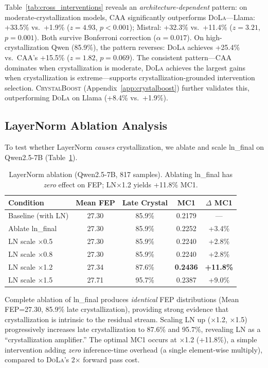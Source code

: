 \documentclass{article}
\newcommand{\dola}{\textsc{DoLa}}
\newcommand{\crystalboost}{\textsc{CrystalBoost}}
\newcommand{\caa}{\textsc{CAA}}
\begin{document}
Table~\ref{tab:cross_interventions} reveals an \emph{architecture-dependent} pattern: on moderate-crystallization models, \caa{} significantly outperforms \dola{}---Llama: +33.5\% vs.\ +1.9\% ($z{=}4.93$, $p{<}0.001$); Mistral: +32.3\% vs.\ +11.4\% ($z{=}3.21$, $p{=}0.001$). Both survive Bonferroni correction ($\alpha{=}0.017$). On high-crystallization Qwen (85.9\%), the pattern reverses: \dola{} achieves +25.4\% vs.\ \caa{}'s +15.5\% ($z{=}1.82$, $p{=}0.069$). The consistent pattern---\caa{} dominates when crystallization is moderate, \dola{} achieves the largest gains when crystallization is extreme---supports crystallization-grounded intervention selection. \crystalboost{} (Appendix~\ref{app:crystalboost}) further validates this, outperforming \dola{} on Llama (+8.4\% vs.\ +1.9\%).

\subsection{LayerNorm Ablation Analysis}
\label{sec:ln_ablation}

To test whether LayerNorm \emph{causes} crystallization, we ablate and scale ln\_final on Qwen2.5-7B (Table~\ref{tab:ln_ablation}).

\begin{table}[t]
\centering
\small
\begin{tabular}{lcccc}
\toprule
\textbf{Condition} & \textbf{Mean FEP} & \textbf{Late Crystal} & \textbf{MC1} & \textbf{$\Delta$ MC1} \\
\midrule
Baseline (with LN) & 27.30 & 85.9\% & 0.2179 & --- \\
Ablate ln\_final & 27.30 & 85.9\% & 0.2252 & +3.4\% \\
LN scale $\times$0.5 & 27.30 & 85.9\% & 0.2240 & +2.8\% \\
LN scale $\times$0.8 & 27.30 & 85.9\% & 0.2240 & +2.8\% \\
LN scale $\times$1.2 & 27.34 & 87.6\% & \textbf{0.2436} & \textbf{+11.8\%} \\
LN scale $\times$1.5 & 27.71 & 95.7\% & 0.2387 & +9.0\% \\
\bottomrule
\end{tabular}
\caption{LayerNorm ablation (Qwen2.5-7B, 817 samples). Ablating ln\_final has \emph{zero} effect on FEP; LN$\times$1.2 yields +11.8\% MC1.}
\label{tab:ln_ablation}
\end{table}

Complete ablation of ln\_final produces \emph{identical} FEP distributions (Mean FEP=27.30, 85.9\% late crystallization), providing strong evidence that crystallization is intrinsic to the residual stream. Scaling LN up ($\times$1.2, $\times$1.5) progressively increases late crystallization to 87.6\% and 95.7\%, revealing LN as a ``crystallization amplifier.'' The optimal MC1 occurs at $\times$1.2 (+11.8\%), a simple intervention adding \emph{zero} inference-time overhead (a single element-wise multiply), compared to \dola{}'s 2$\times$ forward pass cost.
\end{document}
